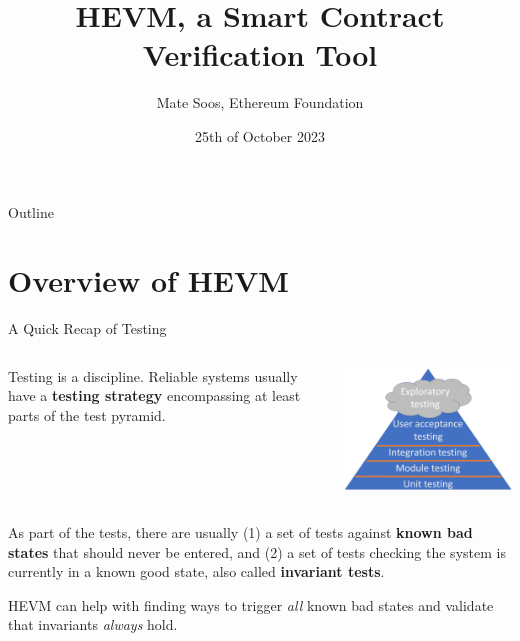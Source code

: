 \documentclass{beamer}
\title{HEVM, a Smart Contract Verification Tool}
\author{Mate Soos, Ethereum Foundation}
\date{25th of October 2023}
\begin{document}
\begin{frame}
    \titlepage 
\end{frame}

\begin{frame}{Outline}
    \tableofcontents
\end{frame}




\section{Overview of HEVM}
\begin{frame}{A Quick Recap of Testing}

\begin{columns}
\begin{column}{0.5\textwidth}
   Testing is a discipline. Reliable systems usually have a \textbf{testing strategy} encompassing at least parts of the test pyramid.
\end{column}
\begin{column}{0.5\textwidth}  %
    \begin{center}
     \includegraphics[scale=0.45]{triangle3.png}
     \end{center}
\end{column}
\end{columns}
\bigskip


As part of the tests, there are usually (1) a set of tests against \textbf{known bad states} that should never be entered, and (2) a set of tests checking the system is currently in a known good state, also called \textbf{invariant tests}.
\bigskip


HEVM can help with finding ways to trigger \emph{all} known bad states and validate that invariants \emph{always} hold.



\end{frame}
\end{document}
